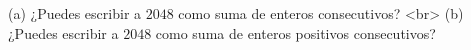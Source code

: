 (a) ¿Puedes escribir a $2048$ como suma de enteros consecutivos? <br>
(b) ¿Puedes escribir a $2048$ como suma de enteros positivos consecutivos?